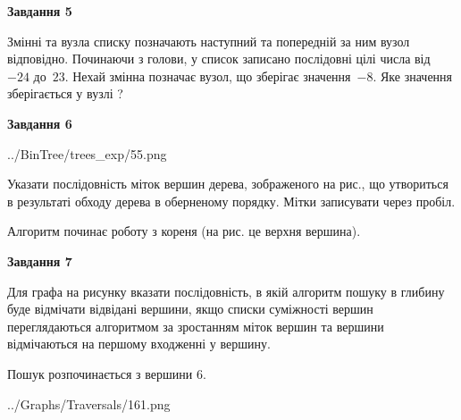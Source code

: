 \documentclass[12pt, ukrainian]{article}
\begin{document}
{\begin {large}
{\begin {center}\textbf{Завдання 5}\end {center}}\par
Змінні  та  вузла списку позначають наступний та попередній за ним вузол відповідно. Починаючи з голови, у список записано послідовні цілі числа від~$-24$ до~$23$. Нехай змінна  позначає вузол, що зберігає значення~$-8$.
Яке значення зберігається у вузлі  ?\par
\newpage

{\begin {center}\textbf{Завдання 6}\end {center}}\par

\begin{center}
	{../BinTree/trees_exp/55.png}
\end{center}
Указати послідовність міток вершин дерева, зображеного на рис., що утвориться в результаті обходу дерева в оберненому порядку. Мітки записувати через пробіл.\par Алгоритм починає роботу з кореня (на рис. це верхня вершина).\par
\newpage

{\begin {center}\textbf{Завдання 7}\end {center}}\par
Для графа на рисунку вказати послідовність, в якій алгоритм пошуку в глибину буде відмічати відвідані вершини, якщо списки суміжності вершин переглядаються алгоритмом за зростанням міток вершин та вершини відмічаються на першому вход\-женні у вершину.\par
Пошук розпочинається з вершини 6.\par

\begin{center}
	{../Graphs/Traversals/161.png}
\end{center}\par
\newpage


\end{large}}
\end{document}
